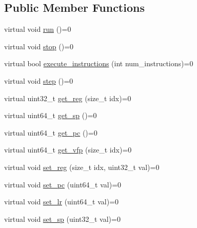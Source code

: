 \subsection*{Public Member Functions}
\begin{DoxyCompactItemize}
\item 
virtual void \mbox{\hyperlink{classeka2l1_1_1arm_1_1jit__interface_a30ede595d2381735d13642768dda3be8}{run}} ()=0
\item 
virtual void \mbox{\hyperlink{classeka2l1_1_1arm_1_1jit__interface_a8454089a0370df8830884c07bc972755}{stop}} ()=0
\item 
virtual bool \mbox{\hyperlink{classeka2l1_1_1arm_1_1jit__interface_a6dbaf8bc64fd987c3b1d96f2644c3811}{execute\+\_\+instructions}} (int num\+\_\+instructions)=0
\item 
virtual void \mbox{\hyperlink{classeka2l1_1_1arm_1_1jit__interface_a424b0596eba2527407be4669d432f9b5}{step}} ()=0
\item 
virtual uint32\+\_\+t \mbox{\hyperlink{classeka2l1_1_1arm_1_1jit__interface_ae68ac4dc5fdb598d36aef40689694f6b}{get\+\_\+reg}} (size\+\_\+t idx)=0
\item 
virtual uint64\+\_\+t \mbox{\hyperlink{classeka2l1_1_1arm_1_1jit__interface_a68ea503b77c6f3014293c41eda739476}{get\+\_\+sp}} ()=0
\item 
virtual uint64\+\_\+t \mbox{\hyperlink{classeka2l1_1_1arm_1_1jit__interface_a89fd7fc20ee959606a71eecb959c610d}{get\+\_\+pc}} ()=0
\item 
virtual uint64\+\_\+t \mbox{\hyperlink{classeka2l1_1_1arm_1_1jit__interface_a30925206698ca8a6fc7d86ec73886d06}{get\+\_\+vfp}} (size\+\_\+t idx)=0
\item 
virtual void \mbox{\hyperlink{classeka2l1_1_1arm_1_1jit__interface_a49acadec0be00056abe923ed36a61bbd}{set\+\_\+reg}} (size\+\_\+t idx, uint32\+\_\+t val)=0
\item 
virtual void \mbox{\hyperlink{classeka2l1_1_1arm_1_1jit__interface_abda1155e6ce73a15e9ccf55a7c2465bb}{set\+\_\+pc}} (uint64\+\_\+t val)=0
\item 
virtual void \mbox{\hyperlink{classeka2l1_1_1arm_1_1jit__interface_a4e4da2ac6f5b627c0c7d9d3951edd053}{set\+\_\+lr}} (uint64\+\_\+t val)=0
\item 
virtual void \mbox{\hyperlink{classeka2l1_1_1arm_1_1jit__interface_a8df41ca8e7ce3c72b3edaadf7bc1369b}{set\+\_\+sp}} (uint32\+\_\+t val)=0
\item 
\mbox{\label{classeka2l1_1_1arm_1_1jit__interface_a747ecacda40bab475241aeb722e5fd0d}} 

\end{DoxyCompactItemize}
